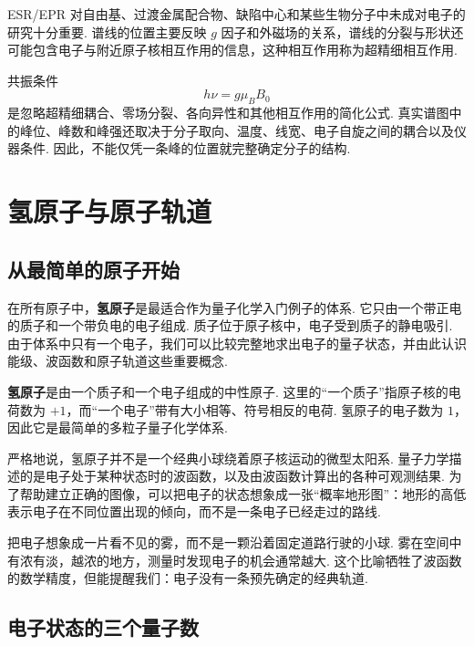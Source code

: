 \documentclass[UTF8,11pt,a4paper,openany]{ctexbook}
\newcommand{\term}[1]{\textbf{#1}}
\begin{document}
ESR/EPR 对自由基、过渡金属配合物、缺陷中心和某些生物分子中未成对电子的研究十分重要. 谱线的位置主要反映 $g$ 因子和外磁场的关系，谱线的分裂与形状还可能包含电子与附近原子核相互作用的信息，这种相互作用称为超精细相互作用. 

\begin{limitbox}
共振条件
\[
h\nu=g\mu_BB_0
\]
是忽略超精细耦合、零场分裂、各向异性和其他相互作用的简化公式. 真实谱图中的峰位、峰数和峰强还取决于分子取向、温度、线宽、电子自旋之间的耦合以及仪器条件. 因此，不能仅凭一条峰的位置就完整确定分子的结构. 
\end{limitbox}
\chapter{氢原子与原子轨道}

\section{从最简单的原子开始}

在所有原子中，\term{氢原子}是最适合作为量子化学入门例子的体系. 它只由一个带正电的质子和一个带负电的电子组成. 质子位于原子核中，电子受到质子的静电吸引. 由于体系中只有一个电子，我们可以比较完整地求出电子的量子状态，并由此认识能级、波函数和原子轨道这些重要概念. 

\begin{definitionbox}
\term{氢原子}是由一个质子和一个电子组成的中性原子. 这里的“一个质子”指原子核的电荷数为 $+1$，而“一个电子”带有大小相等、符号相反的电荷. 氢原子的电子数为 $1$，因此它是最简单的多粒子量子化学体系. 
\end{definitionbox}

严格地说，氢原子并不是一个经典小球绕着原子核运动的微型太阳系. 量子力学描述的是电子处于某种状态时的波函数，以及由波函数计算出的各种可观测结果. 为了帮助建立正确的图像，可以把电子的状态想象成一张“概率地形图”：地形的高低表示电子在不同位置出现的倾向，而不是一条电子已经走过的路线. 

\begin{analogybox}
把电子想象成一片看不见的雾，而不是一颗沿着固定道路行驶的小球. 雾在空间中有浓有淡，越浓的地方，测量时发现电子的机会通常越大. 这个比喻牺牲了波函数的数学精度，但能提醒我们：电子没有一条预先确定的经典轨道. 
\end{analogybox}

\section{电子状态的三个量子数}
\end{document}
